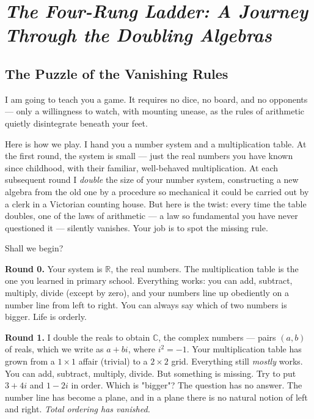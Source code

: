 \chapter{\textit{The Four-Rung Ladder: A Journey Through the Doubling Algebras}}
\label{ch09}



\bigskip


\section{The Puzzle of the Vanishing Rules}

I am going to teach you a game. It requires no dice, no board, and no opponents --- only a willingness to watch, with mounting unease, as the rules of arithmetic quietly disintegrate beneath your feet.

Here is how we play. I hand you a number system and a multiplication table. At the first round, the system is small --- just the real numbers you have known since childhood, with their familiar, well-behaved multiplication. At each subsequent round I \textit{double} the size of your number system, constructing a new algebra from the old one by a procedure so mechanical it could be carried out by a clerk in a Victorian counting house. But here is the twist: every time the table doubles, one of the laws of arithmetic --- a law so fundamental you have never questioned it --- silently vanishes. Your job is to spot the missing rule.

Shall we begin?

\textbf{Round 0.} Your system is $\mathbb{R}$, the real numbers. The multiplication table is the one you learned in primary school. Everything works: you can add, subtract, multiply, divide (except by zero), and your numbers line up obediently on a number line from left to right. You can always say which of two numbers is bigger. Life is orderly.

\textbf{Round 1.} I double the reals to obtain $\mathbb{C}$, the complex numbers --- pairs $(a, b)$ of reals, which we write as $a + bi$, where $i^2 = -1$. Your multiplication table has grown from a $1 \times 1$ affair (trivial) to a $2 \times 2$ grid. Everything still \textit{mostly} works. You can add, subtract, multiply, divide. But something is missing. Try to put $3 + 4i$ and $1 - 2i$ in order. Which is "bigger"? The question has no answer. The number line has become a plane, and in a plane there is no natural notion of left and right. \textit{Total ordering has vanished.}

